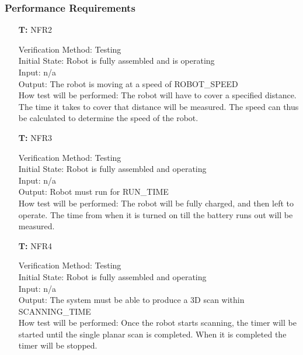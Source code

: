 \documentclass[12pt, titlepage]{article}
\newcounter{tnum} %
\begin{document}
\subsubsection{Performance Requirements}  
\begin{itemize}
  
\item[\textbf{T\refstepcounter{tnum}\thetnum:}]{NFR2\\}

Verification Method: Testing	\\				
Initial State: Robot is fully assembled and is operating	\\			
Input: n/a\\
Output: The robot is moving at a speed of ROBOT\_SPEED \\
How test will be performed: The robot will have to cover a specified distance. The time it takes to cover that distance will be measured. The speed can thus be calculated to determine the speed of the robot. \\
  
\item[\textbf{T\refstepcounter{tnum}\thetnum:}]{NFR3\\}

Verification Method: Testing	\\				
Initial State: Robot is fully assembled and operating	\\			
Input: n/a\\
Output: Robot must run for RUN\_TIME \\
How test will be performed: The robot will be fully charged, and then left to operate. The time from when it is turned on till the battery runs out will be measured. \\
			

\item[\textbf{T\refstepcounter{tnum}\thetnum:}]{NFR4\\}

Verification Method: Testing	\\				
Initial State: Robot is fully assembled	and operating\\		
Input: n/a\\
Output: The system must be able to produce a 3D scan within SCANNING\_TIME \\
How test will be performed: Once the robot starts scanning, the timer will be started until the single planar scan is completed. When it is completed the timer will be stopped. \\


\end{itemize}
\end{document}
